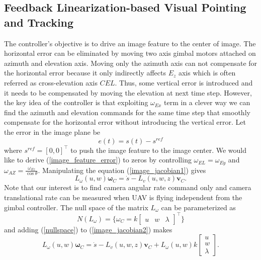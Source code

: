 \subsection{Feedback Linearization-based Visual Pointing and Tracking}
The controller's objective is to drive an image feature to the center of image. The horizontal error can be eliminated by moving two axis gimbal motors attached on azimuth and elevation axis. Moving only the azimuth axis can not compensate for the horizontal error because it only indirectly affects $E_z$ axis which is often referred as cross-elevation axis $CEL$. Thus, some vertical error is introduced and it needs to be compensated by moving the elevation at next time step. However, the key idea of the controller is that exploiting $\omega_{Ex}$ term in a clever way we can find the azimuth and elevation commands for the same time step that smoothly compensate for the horizontal error without introducing the vertical error. Let the error in the image plane be
\begin{equation}
e(t)=s(t)-s^{ref}
\label{image_feature_error}
\end{equation}
where $s^{ref}=[0, 0]^\top$ to push the image feature to the image center. We would like to derive (\ref{image_feature_error}) to zeros by controlling $\omega_{EL}=\omega_{Ey}$ and $\omega_{AZ}=\frac{\omega_{Ez}}{\cos \theta}$. Manipulating the equation (\ref{image_jacobian1}) gives
\begin{equation}
L_{\omega}(u,w)\mathbf{\omega}_C=\dot{s}-L_v(u,w,z)\mathbf{v}_C.
\label{image_jacobian2}
\end{equation}
Note that our interest is to find camera angular rate command only and camera translational rate can be measured when UAV is flying independent from the gimbal controller. The null space of the matrix $L_{\omega}$ can be parameterized as
\begin{equation}
N(L_{\omega})=\{\omega_C=k\begin{bmatrix}
u & w & \lambda
\end{bmatrix}^\top\}
\label{nullspace}
\end{equation}
and adding (\ref{nullspace}) to (\ref{image_jacobian2}) makes
\begin{equation}
L_{\omega}(u,w)\mathbf{\omega}_C=\dot{s}-L_v(u,w,z)\mathbf{v}_C+L_{\omega}(u,w)k\begin{bmatrix}
u \\ w \\ \lambda
\end{bmatrix}.
\label{image_jacobian3}
\end{equation}
